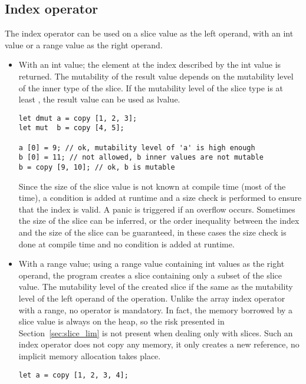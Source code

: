 \subsection{Index operator}

The index operator can be used on a slice value as the left operand, with an int
value or a range value as the right operand.

\begin{itemize}
\item With an int value; the element at the index described by the int value is
  returned. The mutability of the result value depends on the mutability level
  of the inner type of the slice. If the mutability level of the slice type is
  at least , the result value can be used as lvalue.

  \begin{lstlisting}[style=coloredverbatim]
let dmut a = copy [1, 2, 3];
let mut  b = copy [4, 5];

a [0] = 9; // ok, mutability level of 'a' is high enough
b [0] = 11; // not allowed, b inner values are not mutable
b = copy [9, 10]; // ok, b is mutable
  \end{lstlisting}

  Since the size of the slice value is not known at compile time (most of the
  time), a condition is added at runtime and a size check is performed to ensure
  that the index is valid. A panic is triggered if an overflow occurs. Sometimes
  the size of the slice can be inferred, or the order inequality between the
  index and the size of the slice can be guaranteed, in these cases the size
  check is done at compile time and no condition is added at runtime.

\item With a range value; using a range value containing int values as the right
  operand, the program creates a slice containing only a subset of the slice
  value. The mutability level of the created slice if the same as the mutability
  level of the left operand of the operation. Unlike the array index operator
  with a range, no  operator is mandatory. In fact, the memory
  borrowed by a slice value is always on the heap, so the risk presented in
  Section~\ref{sec:slice_lim} is not present when dealing only with slices. Such
  an index operator does not copy any memory, it only creates a new reference,
  no implicit memory allocation takes place.

  \begin{lstlisting}[style=coloredverbatim]
let a = copy [1, 2, 3, 4];


\end{lstlisting}
\end{itemize}
